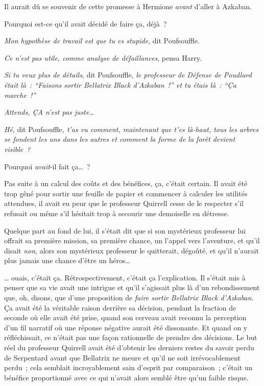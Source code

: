 Il aurait dû se souvenir de cette promesse à Hermione \emph{avant} d'aller à Azkaban.

Pourquoi est-ce qu'il avait décidé de faire ça, déjà~?

\emph{Mon hypothèse de travail est que tu es stupide}, dit Poufsouffle.

\emph{Ce n'est pas utile, comme analyse de défaillances}, pensa Harry.

\emph{Si tu veux plus de détails}, dit Poufsouffle, \emph{le professeur de Défense de Poudlard était là~: “Faisons sortir Bellatrix Black d'Azkaban~!” et tu étais là~: “Ça marche~!”}

\emph{Attends, ÇA n'est pas juste…}

\emph{Hé}, dit Poufsouffle\emph{, t'as vu comment, maintenant que t'es là-haut, tous les arbres se fondent les uns dans les autres et comment la forme de la forêt devient visible~?}

Pourquoi \emph{avait}-il fait ça…~?

Pas suite à un calcul des coûts et des bénéfices, ça, c'était certain. Il avait été trop gêné pour sortir une feuille de papier et commencer à calculer les utilités attendues, il avait eu peur que le professeur Quirrell cesse de le respecter s'il refusait ou même s'il hésitait trop à secourir une demoiselle en détresse.

Quelque part au fond de lui, il s'était dit que si son mystérieux professeur lui offrait sa première mission, sa première chance, un l'appel vers l'aventure, et qu'il disait \emph{non}, alors son mystérieux professeur le quitterait, dégoûté, et qu'il n'aurait plus jamais une chance d'être un héros…

… ouais, c'était ça. Rétrospectivement, c'était ça l'explication. Il s'était mis à penser que sa vie avait une intrigue et qu'il s'agissait plus là d'un rebondissement que, oh, disons, que d'une proposition de \emph{faire sortir Bellatrix Black d'Azkaban.} Ça avait été la véritable raison derrière sa décision, pendant la fraction de seconde où elle avait été prise, quand son cerveau avait reconnu la perception d'un fil narratif où une réponse négative aurait été dissonante. Et quand on y réfléchissait, ce n'était pas une façon rationnelle de prendre des décisions. Le but réel du professeur Quirrell avait été d'obtenir les derniers restes du savoir perdu de Serpentard avant que Bellatrix ne meure et qu'il ne soit irrévocablement perdu~; cela semblait incroyablement sain d'esprit par comparaison~; c'était un bénéfice proportionné avec ce qui n'avait alors semblé être qu'un faible risque.

